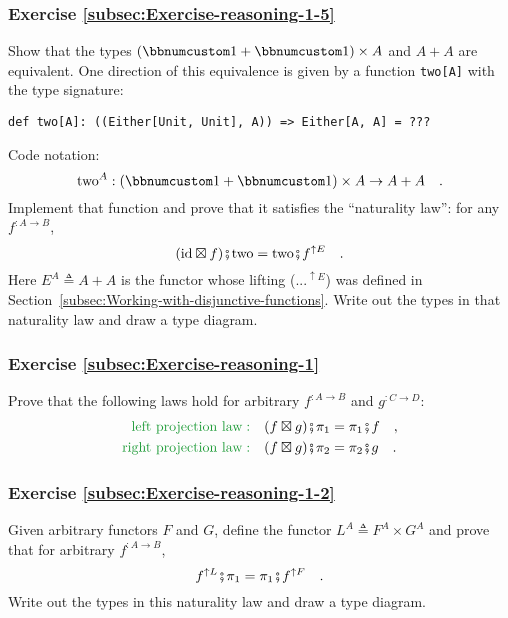 \subsubsection{Exercise \label{subsec:Exercise-reasoning-1-5}\ref{subsec:Exercise-reasoning-1-5}}

Show that the types $(\bbnum 1+\bbnum 1)\times A$ and $A+A$ are
equivalent. One direction of this equivalence is given by a function
\lstinline!two[A]! with the type signature:
\begin{lstlisting}
def two[A]: ((Either[Unit, Unit], A)) => Either[A, A] = ???
\end{lstlisting}
Code notation:
\[
\text{two}^{A}:(\bbnum 1+\bbnum 1)\times A\rightarrow A+A\quad.
\]
Implement that function and prove that it satisfies the \textsf{``}naturality
law\textsf{''}: for any $f^{:A\rightarrow B}$,
\[
(\text{id}\boxtimes f)\bef\text{two}=\text{two}\bef f^{\uparrow E}\quad.
\]
Here $E^{A}\triangleq A+A$ is the functor whose lifting ($...^{\uparrow E}$)
was defined in Section~\ref{subsec:Working-with-disjunctive-functions}.
Write out the types in that naturality law and draw a type diagram. 

\subsubsection{Exercise \label{subsec:Exercise-reasoning-1}\ref{subsec:Exercise-reasoning-1}}

Prove that the following laws hold for arbitrary $f^{:A\rightarrow B}$
and $g^{:C\rightarrow D}$:
\begin{align*}
{\color{greenunder}\text{left projection law}:}\quad & (f\boxtimes g)\bef\pi_{1}=\pi_{1}\bef f\quad,\\
{\color{greenunder}\text{right projection law}:}\quad & (f\boxtimes g)\bef\pi_{2}=\pi_{2}\bef g\quad.
\end{align*}


\subsubsection{Exercise \label{subsec:Exercise-reasoning-1-2}\ref{subsec:Exercise-reasoning-1-2}}

Given arbitrary functors $F$ and $G$, define the functor $L^{A}\triangleq F^{A}\times G^{A}$
and prove that for arbitrary $f^{:A\rightarrow B}$,
\[
f^{\uparrow L}\bef\pi_{1}=\pi_{1}\bef f^{\uparrow F}\quad.
\]
Write out the types in this naturality law and draw a type diagram. 

